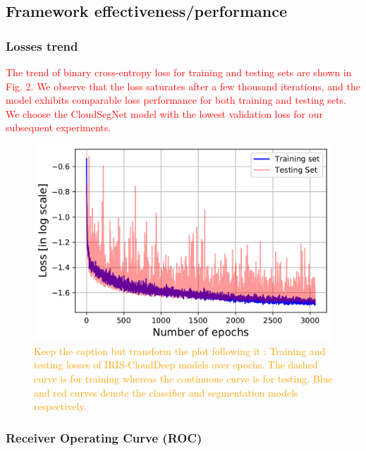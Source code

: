 \documentclass[amt, article]{copernicus}
\begin{document}
\subsection{Framework effectiveness/performance}

\subsubsection{Losses trend}

\textcolor{red}{The trend of binary cross-entropy loss for training and testing sets are shown in Fig. 2. We observe that the loss saturates after
a few thousand iterations, and the model exhibits comparable
loss performance for both training and testing sets. We choose
the CloudSegNet model with the lowest validation loss for our
subsequent experiments.}

\begin{figure}[t]
	\includegraphics[width=\hsize]{figures/loss_trend.png}
	\caption{\textcolor{orange}{Keep the caption but transform the plot following it : Training and testing losses of IRIS-CloudDeep models over
    epochs. The dashed curve is for training whereas the continuous curve is for testing. Blue and red curves denote the classifier and segmentation models respectively.}}
    \label{fig:loss_trend}
\end{figure}

\subsubsection{Receiver Operating Curve (ROC)}
\end{document}

